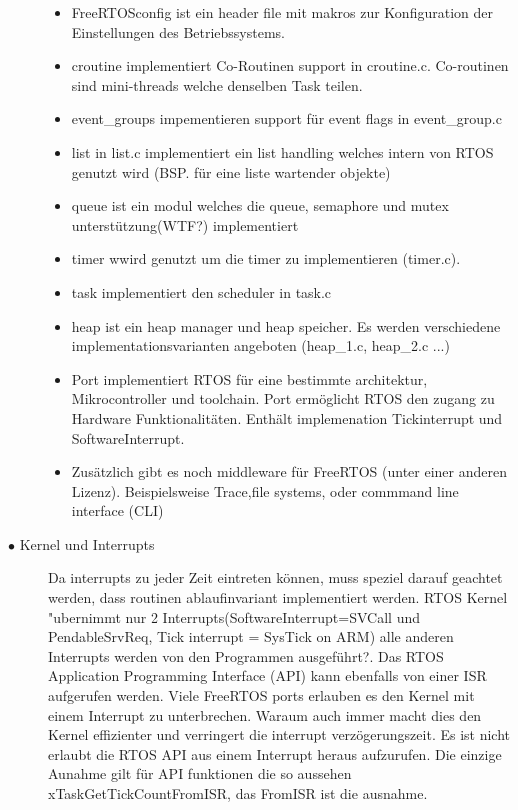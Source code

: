 \documentclass[a4paper, 8pt]{extarticle}
\begin{document}
\begin{multicols*}{3}
\begin{description}
						\begin{itemize}
							\item FreeRTOSconfig ist ein header file mit makros zur Konfiguration der Einstellungen des Betriebssystems.
							\item croutine implementiert Co-Routinen support in croutine.c. Co-routinen sind mini-threads welche denselben Task teilen.
							\item  event\_groups impementieren support für event flags in event\_group.c 
							\item list in list.c implementiert ein list handling welches intern von RTOS genutzt wird (BSP. für eine liste wartender objekte)
							\item queue ist ein modul welches die queue, semaphore und mutex unterstützung(WTF?) implementiert
							\item timer wwird genutzt um die timer zu implementieren (timer.c).
							\item task implementiert den scheduler in task.c
							\item heap ist ein heap manager und heap speicher. Es werden verschiedene implementationsvarianten angeboten (heap\_1.c, heap\_2.c ...)
							\item Port implementiert RTOS für eine bestimmte architektur, Mikrocontroller und toolchain. Port ermöglicht RTOS den zugang zu Hardware
								  Funktionalitäten. Enthält implemenation Tickinterrupt und SoftwareInterrupt.
							\item Zusätzlich gibt es noch middleware für FreeRTOS (unter einer anderen Lizenz). Beispielsweise Trace,file systems, oder commmand line interface (CLI)
						\end{itemize}	
					\item[$\bullet$ Kernel und Interrupts]
							Da interrupts zu jeder Zeit eintreten können, muss speziel darauf geachtet werden, dass routinen ablaufinvariant implementiert werden.
							RTOS Kernel "ubernimmt nur 2 Interrupts(SoftwareInterrupt=SVCall und PendableSrvReq, Tick interrupt = SysTick on ARM) alle anderen Interrupts werden
							von den Programmen ausgeführt?. Das RTOS Application Programming Interface (API) kann ebenfalls von einer ISR aufgerufen werden. Viele FreeRTOS ports erlauben es den 
							Kernel mit einem Interrupt zu unterbrechen. Waraum auch immer macht dies den Kernel effizienter und verringert die interrupt verzögerungszeit. Es ist nicht erlaubt
							die RTOS API aus einem Interrupt heraus aufzurufen. Die einzige Aunahme gilt für API funktionen die so aussehen xTaskGetTickCountFromISR, das FromISR ist die ausnahme.

\end{description}
\end{multicols*}
\end{document}
